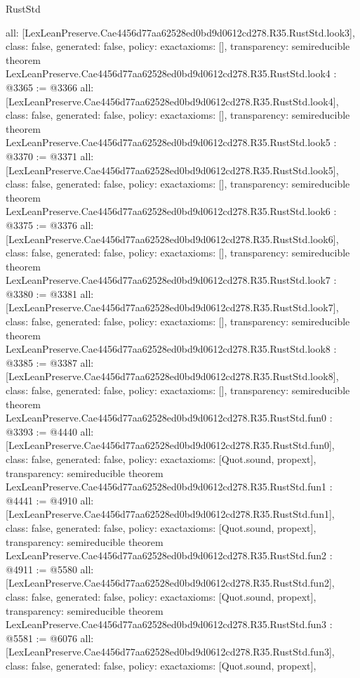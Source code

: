 \begin{lexlean}{RustStd}
\begin{coremodule}
{  all: [LexLeanPreserve.Cae4456d77aa62528ed0bd9d0612cd278.R35.RustStd.look3],
  class: false,
  generated: false,
  policy: exact{axioms: []},
  transparency: semireducible
}
theorem LexLeanPreserve.Cae4456d77aa62528ed0bd9d0612cd278.R35.RustStd.look4 : @3365 := @3366 {
  all: [LexLeanPreserve.Cae4456d77aa62528ed0bd9d0612cd278.R35.RustStd.look4],
  class: false,
  generated: false,
  policy: exact{axioms: []},
  transparency: semireducible
}
theorem LexLeanPreserve.Cae4456d77aa62528ed0bd9d0612cd278.R35.RustStd.look5 : @3370 := @3371 {
  all: [LexLeanPreserve.Cae4456d77aa62528ed0bd9d0612cd278.R35.RustStd.look5],
  class: false,
  generated: false,
  policy: exact{axioms: []},
  transparency: semireducible
}
theorem LexLeanPreserve.Cae4456d77aa62528ed0bd9d0612cd278.R35.RustStd.look6 : @3375 := @3376 {
  all: [LexLeanPreserve.Cae4456d77aa62528ed0bd9d0612cd278.R35.RustStd.look6],
  class: false,
  generated: false,
  policy: exact{axioms: []},
  transparency: semireducible
}
theorem LexLeanPreserve.Cae4456d77aa62528ed0bd9d0612cd278.R35.RustStd.look7 : @3380 := @3381 {
  all: [LexLeanPreserve.Cae4456d77aa62528ed0bd9d0612cd278.R35.RustStd.look7],
  class: false,
  generated: false,
  policy: exact{axioms: []},
  transparency: semireducible
}
theorem LexLeanPreserve.Cae4456d77aa62528ed0bd9d0612cd278.R35.RustStd.look8 : @3385 := @3387 {
  all: [LexLeanPreserve.Cae4456d77aa62528ed0bd9d0612cd278.R35.RustStd.look8],
  class: false,
  generated: false,
  policy: exact{axioms: []},
  transparency: semireducible
}
theorem LexLeanPreserve.Cae4456d77aa62528ed0bd9d0612cd278.R35.RustStd.fun0 : @3393 := @4440 {
  all: [LexLeanPreserve.Cae4456d77aa62528ed0bd9d0612cd278.R35.RustStd.fun0],
  class: false,
  generated: false,
  policy: exact{axioms: [Quot.sound, propext]},
  transparency: semireducible
}
theorem LexLeanPreserve.Cae4456d77aa62528ed0bd9d0612cd278.R35.RustStd.fun1 : @4441 := @4910 {
  all: [LexLeanPreserve.Cae4456d77aa62528ed0bd9d0612cd278.R35.RustStd.fun1],
  class: false,
  generated: false,
  policy: exact{axioms: [Quot.sound, propext]},
  transparency: semireducible
}
theorem LexLeanPreserve.Cae4456d77aa62528ed0bd9d0612cd278.R35.RustStd.fun2 : @4911 := @5580 {
  all: [LexLeanPreserve.Cae4456d77aa62528ed0bd9d0612cd278.R35.RustStd.fun2],
  class: false,
  generated: false,
  policy: exact{axioms: [Quot.sound, propext]},
  transparency: semireducible
}
theorem LexLeanPreserve.Cae4456d77aa62528ed0bd9d0612cd278.R35.RustStd.fun3 : @5581 := @6076 {
  all: [LexLeanPreserve.Cae4456d77aa62528ed0bd9d0612cd278.R35.RustStd.fun3],
  class: false,
  generated: false,
  policy: exact{axioms: [Quot.sound, propext]},
}
\end{coremodule}
\end{lexlean}
